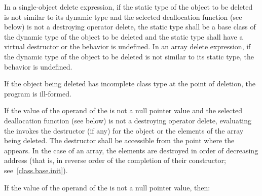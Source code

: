 \pnum
{}%
In a single-object delete expression, if the static type of the object to be
deleted is not similar to its dynamic type
and the selected deallocation function (see below)
is not a destroying operator delete,
the static type shall be a base
class of the dynamic type of the object to be deleted and the static type shall
have a virtual destructor or the behavior is undefined. In an array delete
expression, if the dynamic type of the object to be deleted is not similar to
its static type, the behavior is undefined.

\pnum
{}%
If the object being deleted has incomplete class type at the point of deletion,
the program is ill-formed.

\pnum
{}%
If the value of the operand of the  is not a
null pointer value
and the selected deallocation function (see below)
is not a destroying operator delete,
evaluating the  invokes the
destructor (if any) for the object or the elements of the array being
deleted.
The destructor shall be accessible from the point where
the  appears.
In the case of an array, the elements are destroyed in
order of decreasing address (that is, in reverse order of the completion
of their constructor; see~\ref{class.base.init}).

\pnum
If the value of the operand of the  is not a
null pointer value, then:

